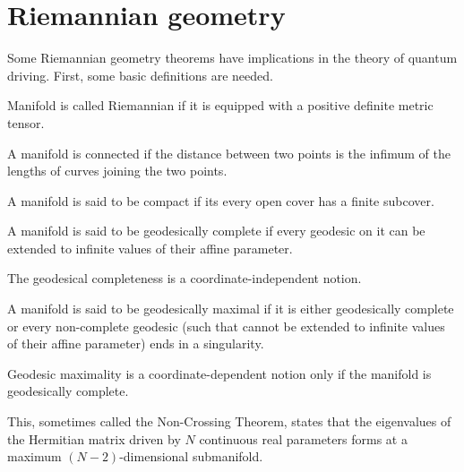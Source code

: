 
\section{Riemannian geometry}
Some Riemannian geometry theorems have implications in the theory of quantum driving. First, some basic definitions are needed.

\begin{definition}
    Manifold is called Riemannian if it is equipped with a positive definite metric tensor.
\end{definition}
\begin{definition}
    A manifold is connected if the distance between two points is the infimum of the lengths of curves joining the two points.
\end{definition}
\begin{definition}
    A manifold is said to be compact if its every open cover has a finite subcover.
\end{definition}
\begin{definition}
    A manifold is said to be geodesically complete if every geodesic on it can be extended to infinite values of their affine parameter. 
\end{definition}
The geodesical completeness is a coordinate-independent notion.
\begin{definition}
    A manifold is said to be geodesically maximal if it is either geodesically complete or every non-complete geodesic (such that cannot be extended to infinite values of their affine parameter) ends in a singularity.
\end{definition}
Geodesic maximality is a coordinate-dependent notion only if the manifold is geodesically complete.


\begin{thm}\emph{\citet[page 305]{landau}}
    \label{thm:n-2}

    This, sometimes called the Non-Crossing Theorem, states that the eigenvalues of the Hermitian matrix driven by $N$ continuous real parameters forms at a maximum $(N-2)$-dimensional submanifold.
\end{thm}



